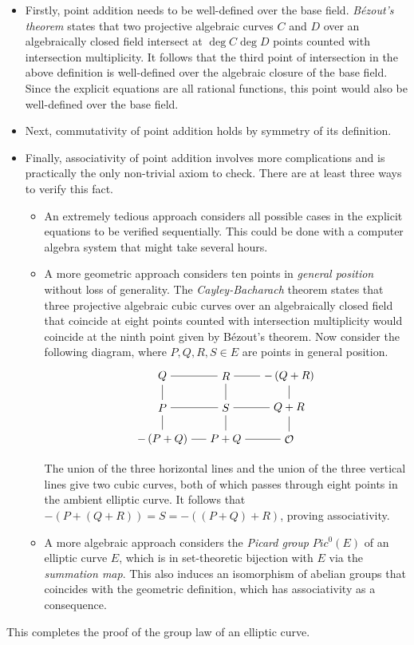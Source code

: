 \documentclass{article}
\newcommand{\rb}[1]{\left( #1 \right)}
\newcommand{\OO}{\mathcal{O}}
\begin{document}
\begin{itemize}
\item Firstly, point addition needs to be well-defined over the base field. \emph{B\'ezout's theorem} states that two projective algebraic curves $ C $ and $ D $ over an algebraically closed field intersect at $ \deg C\deg D $ points counted with intersection multiplicity. It follows that the third point of intersection in the above definition is well-defined over the algebraic closure of the base field. Since the explicit equations are all rational functions, this point would also be well-defined over the base field.
\item Next, commutativity of point addition holds by symmetry of its definition.
\item Finally, associativity of point addition involves more complications and is practically the only non-trivial axiom to check. There are at least three ways to verify this fact.
\begin{itemize}
\item An extremely tedious approach considers all possible cases in the explicit equations to be verified sequentially. This could be done with a computer algebra system that might take several hours.
\item A more geometric approach considers ten points in \emph{general position} without loss of generality. The \emph{Cayley-Bacharach} theorem states that three projective algebraic cubic curves over an algebraically closed field that coincide at eight points counted with intersection multiplicity would coincide at the ninth point given by B\'ezout's theorem. Now consider the following diagram, where $ P, Q, R, S \in E $ are points in general position.
$$
\begin{tikzpicture}
\node(Q) at (-2, 1) {$ Q $};
\node(R) at (0, 1) {$ R $};
\node(QR') at (2, 1) {$ -\rb{Q + R} $};
\node(P) at (-2, 0) {$ P $};
\node(S) at (0, 0) {$ S $};
\node(QR) at (2, 0) {$ Q + R $};
\node(PQ') at (-2, -1) {$ -\rb{P + Q} $};
\node(PQ) at (0, -1) {$ P + Q $};
\node(O) at (2, -1) {$ \OO $};
\draw (Q) -- (R) -- (QR');
\draw (P) -- (S) -- (QR);
\draw (PQ') -- (PQ) -- (O);
\draw (Q) -- (P) -- (PQ');
\draw (R) -- (S) -- (PQ);
\draw (QR') -- (QR) -- (O);
\end{tikzpicture}
$$
The union of the three horizontal lines and the union of the three vertical lines give two cubic curves, both of which passes through eight points in the ambient elliptic curve. It follows that $ -\rb{P + \rb{Q + R}} = S = -\rb{\rb{P + Q} + R} $, proving associativity.
\item A more algebraic approach considers the \emph{Picard group} $ Pic^0\rb{E} $ of an elliptic curve $ E $, which is in set-theoretic bijection with $ E $ via the \emph{summation map}. This also induces an isomorphism of abelian groups that coincides with the geometric definition, which has associativity as a consequence.
\end{itemize}
\end{itemize}
This completes the proof of the group law of an elliptic curve.
\end{document}

